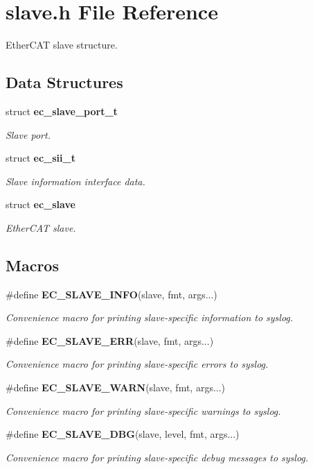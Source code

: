 \section{slave.\-h File Reference}
\label{slave_8h}


Ether\-C\-A\-T slave structure.  


\subsection*{Data Structures}
\begin{DoxyCompactItemize}
\item 
struct {\bf ec\-\_\-slave\-\_\-port\-\_\-t}
\begin{DoxyCompactList}\small\item\em Slave port. \end{DoxyCompactList}\item 
struct {\bf ec\-\_\-sii\-\_\-t}
\begin{DoxyCompactList}\small\item\em Slave information interface data. \end{DoxyCompactList}\item 
struct {\bf ec\-\_\-slave}
\begin{DoxyCompactList}\small\item\em Ether\-C\-A\-T slave. \end{DoxyCompactList}\end{DoxyCompactItemize}
\subsection*{Macros}
\begin{DoxyCompactItemize}
\item 
\#define {\bf E\-C\-\_\-\-S\-L\-A\-V\-E\-\_\-\-I\-N\-F\-O}(slave, fmt, args...)
\begin{DoxyCompactList}\small\item\em Convenience macro for printing slave-\/specific information to syslog. \end{DoxyCompactList}\item 
\#define {\bf E\-C\-\_\-\-S\-L\-A\-V\-E\-\_\-\-E\-R\-R}(slave, fmt, args...)
\begin{DoxyCompactList}\small\item\em Convenience macro for printing slave-\/specific errors to syslog. \end{DoxyCompactList}\item 
\#define {\bf E\-C\-\_\-\-S\-L\-A\-V\-E\-\_\-\-W\-A\-R\-N}(slave, fmt, args...)
\begin{DoxyCompactList}\small\item\em Convenience macro for printing slave-\/specific warnings to syslog. \end{DoxyCompactList}\item 
\#define {\bf E\-C\-\_\-\-S\-L\-A\-V\-E\-\_\-\-D\-B\-G}(slave, level, fmt, args...)
\begin{DoxyCompactList}\small\item\em Convenience macro for printing slave-\/specific debug messages to syslog. \end{DoxyCompactList}\end{DoxyCompactItemize}
